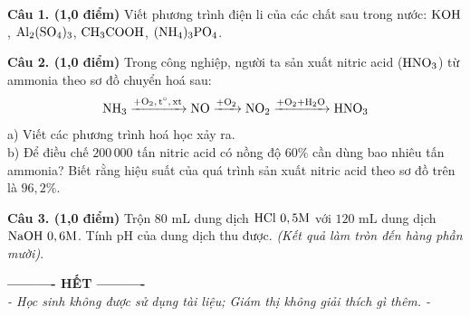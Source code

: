\documentclass[11pt,a4paper]{article}
\begin{document}
\noindent
\textbf{Câu 1. (1,0 điểm)} Viết phương trình điện li của các chất sau trong nước: $\ce{KOH}$, $\ce{Al2(SO4)3}$, $\ce{CH3COOH}$, $\ce{(NH4)3PO4}$.

\vspace{1pt}
\noindent
{}

\vspace{4pt}
\noindent
\textbf{Câu 2. (1,0 điểm)} Trong công nghiệp, người ta sản xuất nitric acid ($\ce{HNO3}$) từ ammonia theo sơ đồ chuyển hoá sau:
$$\ce{NH3 ->[+O2, t^\circ, xt] NO ->[+O2] NO2 ->[+O2 + H2O] HNO3}$$
a) Viết các phương trình hoá học xảy ra.\\
b) Để điều chế $200\,000\text{ tấn}$ nitric acid có nồng độ $60\%$ cần dùng bao nhiêu tấn ammonia? Biết rằng hiệu suất của quá trình sản xuất nitric acid theo sơ đồ trên là $96,2\%$.

\vspace{1pt}
\noindent
{}

\vspace{4pt}
\noindent
\textbf{Câu 3. (1,0 điểm)} Trộn $80\text{ mL}$ dung dịch $\ce{HCl}\ 0,5\text{M}$ với $120\text{ mL}$ dung dịch $\ce{NaOH}\ 0,6\text{M}$. Tính pH của dung dịch thu được. \textit{(Kết quả làm tròn đến hàng phần mười)}.

\vspace{1pt}
\noindent
{}

\vspace{6pt}
\begin{center}
\textbf{\large ---------- HẾT ----------}\\
\textit{\small - Học sinh không được sử dụng tài liệu; Giám thị không giải thích gì thêm. -}
\end{center}
\end{document}
